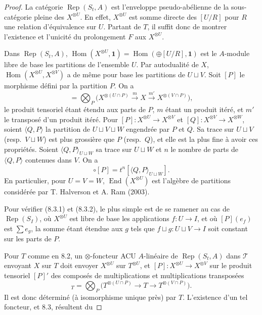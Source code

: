 \documentclass[11pt,a4paper]{article}
\theoremstyle{plain}
\theoremstyle{definition}
\DeclareMathOperator{\Hom}{Hom}
\DeclareMathOperator{\End}{End}
\DeclareMathOperator{\Rep}{Rep}
\begin{document}
\begin{proof}
La cat\'egorie $\Rep(S_t, A)$ est l'enveloppe pseudo-ab\'elienne de la sous-cat\'egorie pleine des $X^{\otimes U}$. En effet, $X^{\otimes U}$ est somme directe des $[U/R]$ pour $R$ une relation d'\'equivalence sur $U$. Partant de $T$, il suffit donc de montrer l'existence et l'unicit\'e du prolongement $F$ aux $X^{\otimes U}$.

Dans $\Rep(S_t, A)$, $\Hom(X^{\otimes U}, \mathbf{1}) = \Hom(\oplus [U/R], \mathbf{1})$ est le $A$-module libre de base les partitions de l'ensemble $U$. Par autodualit\'e de $X$, $\Hom(X^{\otimes U}, X^{\otimes V})$ a de m\^eme pour base les partitions de $U \sqcup V$. Soit $[P]$ le morphisme d\'efini par la partition $P$. On a
\begin{equation}
[P] = \bigotimes_{P} \bigl(X^{\otimes (U \cap P)} \xrightarrow{m} X \xrightarrow{m'} X^{\otimes (V \cap P)}\bigr), \tag{8.3.1}
\end{equation}
le produit tensoriel \'etant \'etendu aux parts de $P$, $m$ \'etant un produit it\'er\'e, et $m'$ le transpos\'e d'un produit it\'er\'e. Pour $[P] : X^{\otimes U} \to X^{\otimes V}$ et $[Q] : X^{\otimes V} \to X^{\otimes W}$, soient $\langle Q, P \rangle$ la partition de $U \sqcup V \sqcup W$ engendr\'ee par $P$ et $Q$. Sa trace sur $U \sqcup V$ (resp.~$V \sqcup W$) est plus grossi\`ere que $P$ (resp.~$Q$), et elle est la plus fine \`a avoir ces propri\'et\'es. Soient $\langle Q, P \rangle_{U \sqcup W}$ sa trace sur $U \sqcup W$ et $n$ le nombre de parts de $\langle Q, P \rangle$ contenues dans $V$. On a
\begin{equation}
[Q] \circ [P] = t^n [\langle Q, P \rangle_{U \sqcup W}]. \tag{8.3.2}
\end{equation}
En particulier, pour $U = V = W$, $\End(X^{\otimes U})$ est l'alg\`ebre de partitions consid\'er\'ee par T. Halverson et A. Ram (2003).

Pour v\'erifier (8.3.1) et (8.3.2), le plus simple est de se ramener au cas de $\Rep(S_I)$, o\`u $X^{\otimes U}$ est libre de base les applications $f : U \to I$, et o\`u $[P](e_f)$ est $\sum e_g$, la somme \'etant \'etendue aux $g$ tels que $f \sqcup g : U \sqcup V \to I$ soit constant sur les parts de $P$.

Pour $T$ comme en 8.2, un $\otimes$-foncteur ACU $A$-lin\'eaire de $\Rep(S_t, A)$ dans $\mathcal{T}$ envoyant $X$ sur $T$ doit envoyer $X^{\otimes U}$ sur $T^{\otimes U}$, et $[P] : X^{\otimes U} \to X^{\otimes V}$ sur le produit tensoriel $[P]'$ des compos\'es de multiplications et multiplications transpos\'ees
\begin{equation}
[P]_T = \bigotimes_{P} \bigl(T^{\otimes (U \cap P)} \to T \to T^{\otimes (V \cap P)}\bigr). \tag{8.3.3}
\end{equation}
Il est donc d\'etermin\'e (\`a isomorphisme unique pr\`es) par $T$. L'existence d'un tel foncteur, et 8.3, r\'esultent du
\end{proof}
\end{document}
